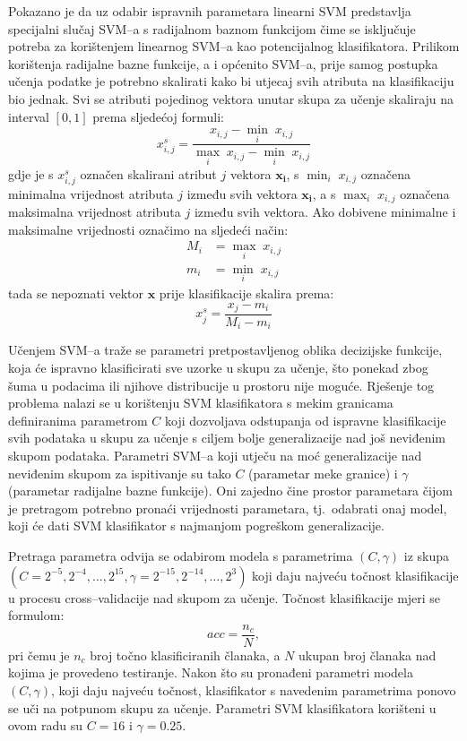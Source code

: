 \documentclass[11pt,english]{article}
\begin{document}
\begin{multicols}{2}
Pokazano je da uz odabir ispravnih parametara \citep{keerthi2003asymptotic} linearni SVM
predstavlja specijalni slučaj SVM--a s radijalnom baznom funkcijom čime
se isključuje potreba za korištenjem linearnog SVM--a kao potencijalnog
klasifikatora. Prilikom korištenja radijalne bazne funkcije, a i općenito
SVM--a, prije samog postupka učenja podatke je potrebno skalirati kako bi utjecaj svih
atributa na klasifikaciju bio jednak. Svi se atributi pojedinog vektora unutar
skupa za učenje skaliraju na interval $[0, 1]$ prema sljedećoj formuli:
\begin{equation}
x^{s}_{i,j} = \frac{x_{i,j} - \min_{i}\; x_{i,j}}{\max_{i}\; x_{i,j}
- \min_{i}\; x_{i,j}}
\end{equation}
gdje je s $x^{s}_{i,j}$ označen skalirani atribut $j$ vektora $\mathbf{x_i}$, s
$\min_{i}\; x_{i,j}$ označena minimalna vrijednost atributa $j$ između svih
vektora $\mathbf{x_i}$, a s $\max_{i}\; x_{i,j}$ označena maksimalna vrijednost
atributa $j$ između svih vektora. Ako dobivene minimalne i maksimalne vrijednosti označimo na sljedeći
način:
\begin{eqnarray}
M_i & = \max_{i}\; x_{i,j} \\
m_i & = \min_{i}\; x_{i,j}
\end{eqnarray}
tada se nepoznati vektor $\mathbf{x}$ prije klasifikacije skalira prema:
\begin{equation}
x^{s}_{j} = \frac{x_j-m_i}{M_i-m_i}
\end{equation}

Učenjem SVM--a traže se parametri pretpostavljenog oblika decizijske funkcije,
koja će ispravno klasificirati sve uzorke u skupu za učenje, što ponekad zbog
šuma u podacima ili njihove distribucije u prostoru nije moguće. Rješenje tog
problema nalazi se u korištenju SVM klasifikatora s mekim granicama definiranima
parametrom $C$ koji dozvoljava odstupanja od ispravne klasifikacije svih podataka
u skupu za učenje s ciljem bolje generalizacije nad još neviđenim skupom
podataka. Parametri SVM--a koji utječu na moć generalizacije nad neviđenim skupom
za ispitivanje su tako $C$ (parametar meke granice) i $\gamma$ (parametar
radijalne bazne funkcije). Oni zajedno čine prostor parametara čijom je pretragom
potrebno pronaći vrijednosti parametara, tj.~odabrati onaj model, koji će dati
SVM klasifikator s najmanjom pogreškom generalizacije.

Pretraga parametra odvija se odabirom modela s parametrima $(C, \gamma)$ iz skupa
$\left (C = {2^{-5}, 2^{-4}, \ldots , 2^{15}},  \gamma = {2^{-15}, 2^{-14},
\ldots, 2^3} \right )$ \citep{CC01a} koji daju najveću točnost klasifikacije u
procesu cross--validacije nad skupom za učenje. Točnost klasifikacije mjeri se formulom:
\begin{equation}
acc = \frac{n_c}{N},
\end{equation}
pri čemu je $n_c$ broj točno klasificiranih članaka, a $N$ ukupan broj članaka
nad kojima je provedeno testiranje. Nakon što su pronađeni parametri modela $(C,
\gamma)$, koji daju najveću točnost, klasifikator s navedenim parametrima ponovo
se uči na potpunom skupu za učenje. Parametri SVM klasifikatora korišteni u ovom
radu su $C = 16$ i $\gamma = 0.25$.


\end{multicols}
\end{document}
